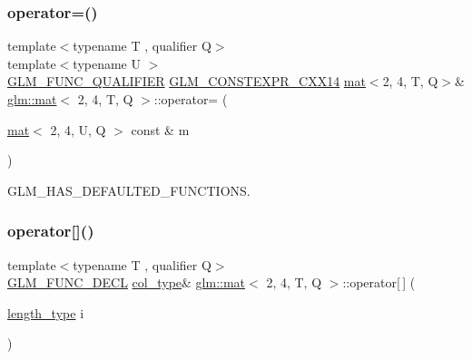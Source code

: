 \mbox{\label{structglm_1_1mat_3_012_00_014_00_01_t_00_01_q_01_4_a19be71908044d2aa85169d495b738c8f}} 
\subsubsection{\texorpdfstring{operator=()}{operator=()}\hspace{0.1cm}{\footnotesize\ttfamily [3/3]}}
{\footnotesize\ttfamily template$<$typename T , qualifier Q$>$ \\
template$<$typename U $>$ \\
\mbox{\hyperlink{setup_8hpp_a33fdea6f91c5f834105f7415e2a64407}{G\+L\+M\+\_\+\+F\+U\+N\+C\+\_\+\+Q\+U\+A\+L\+I\+F\+I\+ER}} \mbox{\hyperlink{setup_8hpp_a4dd12abf5e1164bc57f3a34671d03844}{G\+L\+M\+\_\+\+C\+O\+N\+S\+T\+E\+X\+P\+R\+\_\+\+C\+X\+X14}} \mbox{\hyperlink{structglm_1_1mat}{mat}}$<$2, 4, T, Q$>$\& \mbox{\hyperlink{structglm_1_1mat}{glm\+::mat}}$<$ 2, 4, T, Q $>$\+::operator= (\begin{DoxyParamCaption}\item[{\mbox{\hyperlink{structglm_1_1mat}{mat}}$<$ 2, 4, U, Q $>$ const \&}]{m }\end{DoxyParamCaption})}



G\+L\+M\+\_\+\+H\+A\+S\+\_\+\+D\+E\+F\+A\+U\+L\+T\+E\+D\+\_\+\+F\+U\+N\+C\+T\+I\+O\+NS. 

\mbox{\label{structglm_1_1mat_3_012_00_014_00_01_t_00_01_q_01_4_a30332bf17d9c1668fcdc80e301cfe118}} 
\subsubsection{\texorpdfstring{operator[]()}{operator[]()}\hspace{0.1cm}{\footnotesize\ttfamily [1/2]}}
{\footnotesize\ttfamily template$<$typename T , qualifier Q$>$ \\
\mbox{\hyperlink{setup_8hpp_ab2d052de21a70539923e9bcbf6e83a51}{G\+L\+M\+\_\+\+F\+U\+N\+C\+\_\+\+D\+E\+CL}} \mbox{\hyperlink{structglm_1_1mat_3_012_00_014_00_01_t_00_01_q_01_4_ae14ad10a9d8ce3908ec89ae373a27872}{col\+\_\+type}}\& \mbox{\hyperlink{structglm_1_1mat}{glm\+::mat}}$<$ 2, 4, T, Q $>$\+::operator\mbox{[}$\,$\mbox{]} (\begin{DoxyParamCaption}\item[{\mbox{\hyperlink{structglm_1_1mat_3_012_00_014_00_01_t_00_01_q_01_4_a5295c484627e965d615f3367c2ca45d8}{length\+\_\+type}}}]{i }\end{DoxyParamCaption})}

